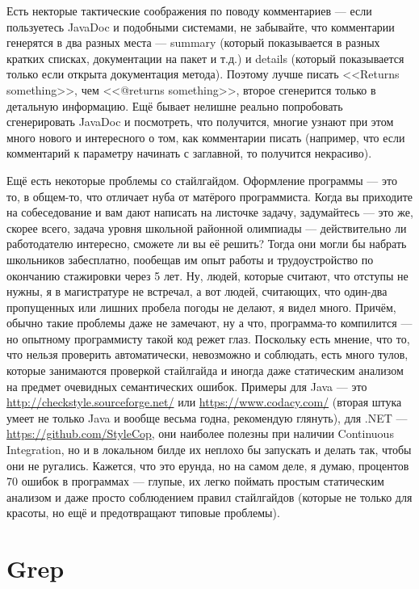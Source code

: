 \documentclass[a5paper]{article}
\begin{document}
Есть некторые тактические соображения по поводу комментариев --- если пользуетесь JavaDoc и подобными системами, не забывайте, что комментарии генерятся в два разных места --- summary (который показывается в разных кратких списках, документации на пакет и т.д.) и details (который показывается только если открыта документация метода). Поэтому лучше писать <<Returns something>>, чем <<@returns something>>, второе сгенерится только в детальную информацию. Ещё бывает нелишне реально попробовать сгенерировать JavaDoc и посмотреть, что получится, многие узнают при этом много нового и интересного о том, как комментарии писать (например, что если комментарий к параметру начинать с заглавной, то получится некрасиво).

Ещё есть некоторые проблемы со стайлгайдом. Оформление программы --- это то, в общем-то, что отличает нуба от матёрого программиста. Когда вы приходите на собеседование и вам дают написать на листочке задачу, задумайтесь --- это же, скорее всего, задача уровня школьной районной олимпиады --- действительно ли работодателю интересно, сможете ли вы её решить? Тогда они могли бы набрать школьников забесплатно, пообещав им опыт работы и трудоустройство по окончанию стажировки через 5 лет. Ну, людей, которые считают, что отступы не нужны, я в магистратуре не встречал, а вот людей, считающих, что один-два пропущенных или лишних пробела погоды не делают, я видел много. Причём, обычно такие проблемы даже не замечают, ну а что, программа-то компилится --- но опытному программисту такой код режет глаз. Поскольку есть мнение, что то, что нельзя проверить автоматически, невозможно и соблюдать, есть много тулов, которые занимаются проверкой стайлгайда и иногда даже статическим анализом на предмет очевидных семантических ошибок. Примеры для Java --- это \url{http://checkstyle.sourceforge.net/} или \url{https://www.codacy.com/} (вторая штука умеет не только Java и вообще весьма годна, рекомендую глянуть), для .NET --- \url{https://github.com/StyleCop}, они наиболее полезны при наличии Continuous Integration, но и в локальном билде их неплохо бы запускать и делать так, чтобы они не ругались. Кажется, что это ерунда, но на самом деле, я думаю, процентов 70 ошибок в программах --- глупые, их легко поймать простым статическим анализом и даже просто соблюдением правил стайлгайдов (которые не только для красоты, но ещё и предотвращают типовые проблемы).

\section{Grep}
\end{document}
